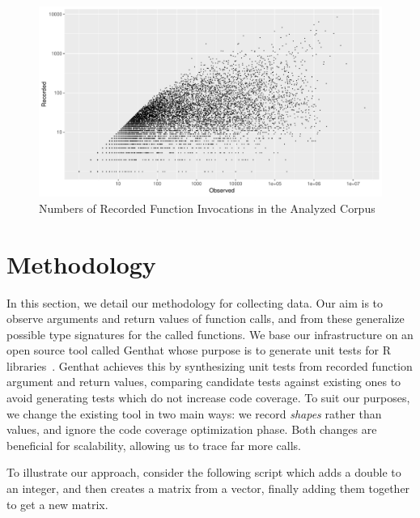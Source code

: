 \documentclass[acmsmall,10pt,review,anonymous]{acmart}\settopmatter{printfolios=true,printccs=false,printacmref=false}
\newcommand{\genthat}{{\sc Genthat}\xspace}
\begin{document}
\begin{figure}[htbp]\begin{center}
\includegraphics[width=.9\textwidth]{recordsbypkg}
\caption{Numbers of Recorded Function Invocations in the Analyzed Corpus}
\label{recorded}\end{center}
\end{figure}

\newpage
\section{Methodology}

In this section, we detail our methodology for collecting data.  Our aim is
to observe arguments and return values of function calls, and from these
generalize possible type signatures for the called functions.  We base our
infrastructure on an open source tool called \genthat whose purpose is to
generate unit tests for R libraries~\cite{issta18}.  \genthat achieves this
by synthesizing unit tests from recorded function argument and return
values, comparing candidate tests against existing ones to avoid generating
tests which do not increase code coverage.  To suit our purposes, we change
the existing tool in two main ways: we record \emph{shapes} rather than
values, and ignore the code coverage optimization phase.  Both changes are
beneficial for scalability, allowing us to trace far more calls.


To illustrate our approach, consider the following script which adds a
double to an integer, and then creates a matrix from a vector, finally
adding them together to get a new matrix.
\end{document}
